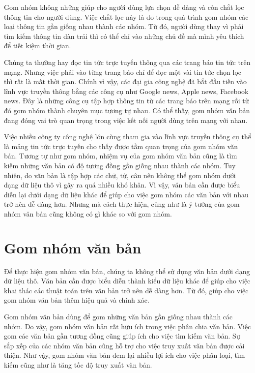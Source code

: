 Gom nhóm không những giúp cho người dùng lựa chọn dễ dàng và còn chắt lọc thông tin cho người dùng.
Việc chắt lọc này là do trong quá trình gom nhóm các loại thông tin gần giống nhau thành các nhóm.
Từ đó, người dùng thay vì phải tìm kiếm thông tin dàn trải thì có thể chỉ vào những chủ đề mà mình yêu thích để tiết kiệm thời gian.

Chúng ta thường hay đọc tin tức trực tuyến thông qua các trang báo tin tức trên mạng.
Nhưng việc phải vào từng trang báo chỉ để đọc một vài tin tức chọn lọc thì rất là mất thời gian.
Chính vì vậy, các đại gia công nghệ đã bắt đầu tiến vào lĩnh vực truyền thông bằng các công cụ như Google news, Apple news, Facebook news. 
Đây là những công cụ tập hợp thông tin từ các trang báo trên mạng rồi từ đó gom nhóm thành chuyên mục tương tự nhau.
Có thể thấy, gom nhóm văn bản đang đóng vai trò quan trọng trong việc kết nối người dùng trên mạng với nhau.

Việc nhiều công ty công nghệ lớn cùng tham gia vào lĩnh vực truyền thông cụ thể là mảng tin tức trực tuyến cho thấy được tầm quan trọng của gom nhóm văn bản.
Tương tự như gom nhóm, nhiệm vụ của gom nhóm văn bản cũng là tìm kiếm những văn bản có độ tương đồng gần giống nhau thành các nhóm.
Tuy nhiên, do văn bản là tập hợp các chữ, từ, câu nên không thể gom nhóm dưới dạng dữ liệu thô vì gây ra quá nhiều khó khăn.
Vì vậy, văn bản cần được biểu diễn lại dưới dạng dữ liệu khác để giúp cho việc gom nhóm các văn bản với nhau trở nên dễ dàng hơn.
Nhưng mà cách thực hiện, cũng như là ý tưởng của gom nhóm văn bản cũng không có gì khác so với gom nhóm.

\section{Gom nhóm văn bản}

Để thực hiện gom nhóm văn bản, chúng ta không thể sử dụng văn bản dưới dạng dữ liệu thô.
Văn bản cần được biểu diễn thành kiểu dữ liệu khác để giúp cho việc khai thác các thuật toán trên văn bản trở nên dễ dàng hơn.
Từ đó, giúp cho việc gom nhóm văn bản thêm hiệu quả và chính xác.


Gom nhóm văn bản dùng để gom những văn bản gần giống nhau thành các nhóm. 
Do vậy, gom nhóm văn bản rất hữu ích trong việc phân chia văn bản.
Việc gom các văn bản gần tương đồng cũng giúp ích cho việc tìm kiếm văn bản.
Sự sắp xếp của các nhóm văn bản cũng hỗ trợ cho việc truy xuất văn bản được cải thiện.
Như vậy, gom nhóm văn bản đem lại nhiều lợi ích cho việc phân loại, tìm kiếm cũng như là tăng tốc độ truy xuất văn bản.

